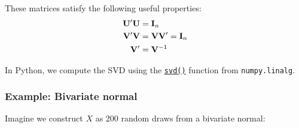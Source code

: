 \documentclass[10pt]{scrartcl}
\begin{document}
These matrices satisfy the following useful properties: \[
\def\bV{\mathbf{V}}
\def\bU{\mathbf{U}}
\def\bI{\mathbf{I}}
\begin{aligned}
    \bU' \bU &= \bI_n \\
    \bV' \bV &= \bV\bV' = \bI_n \\
    \bV' &= \bV^{-1}
\end{aligned}
\]

In Python, we compute the SVD using the
\href{https://numpy.org/doc/stable/reference/generated/numpy.linalg.svd.html}{\texttt{svd()}}
function from \texttt{numpy.linalg}.

    \hypertarget{example-bivariate-normal}{%
\subsubsection{Example: Bivariate
normal}\label{example-bivariate-normal}}

Imagine we construct \(X\) as 200 random draws from a bivariate normal:
\end{document}
